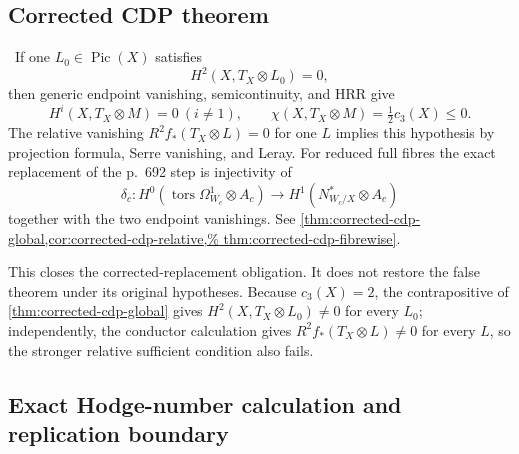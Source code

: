 \subsection{Corrected CDP theorem}

\begin{auditrecord}
\Verified\ If one \(L_0\in\operatorname{Pic}(X)\) satisfies
\[
 H^2(X,T_X\otimes L_0)=0,
\]
then generic endpoint vanishing, semicontinuity, and HRR give
\[
 H^i(X,T_X\otimes M)=0\ (i\ne1),\qquad
 \chi(X,T_X\otimes M)=\tfrac12c_3(X)\le0.
\]
The relative vanishing \(R^2f_*(T_X\otimes L)=0\) for one \(L\) implies
this hypothesis by projection formula, Serre vanishing, and Leray.  For
reduced full fibres the exact replacement of the p.~692 step is injectivity
of
\[
 \delta_c:H^0(\operatorname{tors}\Omega^1_{W_c}\otimes A_c)
 \longrightarrow H^1(N^*_{W_c/X}\otimes A_c)
\]
together with the two endpoint vanishings.  See
\cref{thm:corrected-cdp-global,cor:corrected-cdp-relative,%
thm:corrected-cdp-fibrewise}.

This closes the corrected-replacement obligation.  It does not restore the
false theorem under its original hypotheses.  Because \(c_3(X)=2\), the
contrapositive of \cref{thm:corrected-cdp-global} gives
\(H^2(X,T_X\otimes L_0)\ne0\) for every \(L_0\); independently, the conductor
calculation gives \(R^2f_*(T_X\otimes L)\ne0\) for every \(L\), so the stronger
relative sufficient condition also fails.
\end{auditrecord}

\subsection{Exact Hodge-number calculation and replication boundary}

